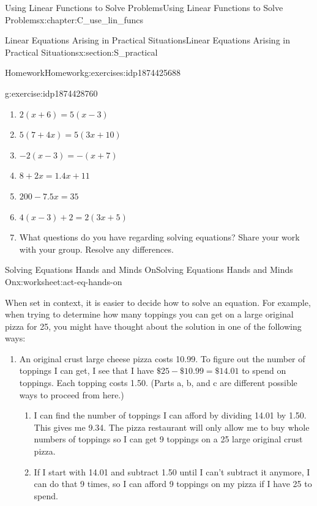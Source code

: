 \documentclass[oneside,10pt,]{book}
\numberwithin{equation}{chapter}
\begin{document}
\begin{chapterptx}{Using Linear Functions to Solve Problems}{}{Using Linear Functions to Solve Problems}{}{}{x:chapter:C_use_lin_funcs}
\begin{sectionptx}{Linear Equations Arising in Practical Situations}{}{Linear Equations Arising in Practical Situations}{}{}{x:section:S_practical}
\begin{exercises-subsection}{Homework}{}{Homework}{}{}{g:exercises:idp1874425688}
\begin{divisionexercise}{3}{}{}{g:exercise:idp1874428760}
\begin{enumerate}[font=\bfseries,label=(\alph*),ref=\alph*]
\item{}\(2 \left( x + 6 \right) = 5 \left( x - 3 \right)\)%
\item{}\(5 \left( 7 + 4x \right) = 5 \left( 3x + 10 \right)\)%
\item{}\(-2 \left( x - 3 \right) = - \left( x + 7 \right)\)%
\item{}\(8 + 2x = 1.4x + 11\)%
\item{}\(200 - 7.5x = 35\)%
\item{}\(4 \left( x - 3 \right) + 2 = 2 \left( 3x + 5 \right)\)%
\item{}What questions do you have regarding solving equations? Share your work with your group. Resolve any differences.%
\end{enumerate}
\end{divisionexercise}%
\end{exercises-subsection}
%
%
\typeout{************************************************}
\typeout{************************************************}
%
\begin{worksheet-subsection}{Solving Equations \textemdash{} Hands and Minds On}{}{Solving Equations \textemdash{} Hands and Minds On}{}{}{x:worksheet:act-eq-hands-on}
\begin{introduction}{}%
When set in context, it is easier to decide how to solve an equation. For example, when trying to determine how many toppings you can get on a large original pizza for \textdollar{}25, you might have thought about the solution in one of the following ways:%
\begin{enumerate}[label=(\alph*)]
\item{}An original crust large cheese pizza costs \textdollar{}10.99. To figure out the number of toppings I can get, I see that I have \(\$25 - \$10.99 = \$14.01\) to spend on toppings. Each topping costs \textdollar{}1.50. (Parts a, b, and c are different possible ways to proceed from here.)%
\begin{enumerate}[label=\roman*.]
\item{}I can find the number of toppings I can afford by dividing \textdollar{}14.01 by \textdollar{}1.50. This gives me 9.34. The pizza restaurant will only allow me to buy whole numbers of toppings so I can get 9 toppings on a \textdollar{}25 large original crust pizza.%
\item{}If I start with \textdollar{}14.01 and subtract 1.50 until I can't subtract it anymore, I can do that 9 times, so I can afford 9 toppings on my pizza if I have \textdollar{}25 to spend.%

\end{enumerate}
\end{enumerate}
\end{introduction}
\end{worksheet-subsection}
\end{sectionptx}
\end{chapterptx}
\end{document}
